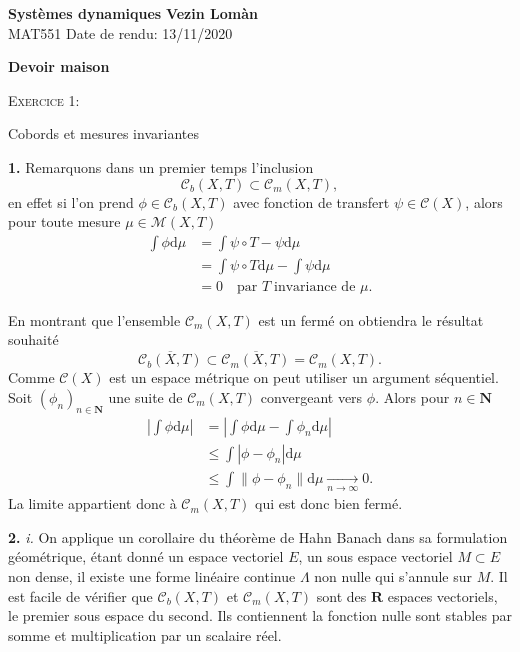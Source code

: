 \documentclass[12pt]{article}
\newenvironment{ex}[1]
{\begin{mdframed}[linewidth=0.6pt]
        \textsc{Exercice #1:}

}
    {\end{mdframed}}
\newcommand{\R}{\mathbf{R}}
\newcommand{\N}{\mathbf{N}}
\newcommand{\de}{\mathrm{d}}
\begin{document}
        \noindent
\textbf{Systèmes dynamiques} \hfill \textbf{Vezin Lomàn}\\
\normalsize MAT551  \hfill Date de rendu: 13/11/2020\\

\begin{center}
\textbf{Devoir maison}
\end{center}

\begin{ex}{1}
        Cobords et mesures invariantes
\end{ex}

\textbf{1.} Remarquons dans un premier temps l'inclusion
\[
        \mathcal{C}_{b}(X,T) \subset \mathcal{C}_{m}(X,T)
,\] en effet si l'on prend $\phi \in \mathcal{C}_{b}(X,T)$ avec fonction de transfert $\psi \in \mathcal{C}(X)$, alors pour toute mesure $\mu \in \mathcal{M}(X,T)$ 
\begin{align*}
        \int\phi\de\mu &= \int\psi\circ T - \psi\de\mu \\
                       &= \int \psi \circ T \de \mu - \int\psi\de\mu \\
                       &= 0 \quad \text{par } T \; \text{invariance de } \mu
.\end{align*}

En montrant que l'ensemble $\mathcal{C}_{m}(X,T)$ est un fermé on obtiendra le résultat souhaité \[
        \overline{\mathcal{C}_{b}(X,T)} \subset \overline{\mathcal{C}_{m}(X,T)} = \mathcal{C}_{m}(X,T)
.\] 
Comme $\mathcal{C}(X)$ est un espace métrique on peut utiliser un argument séquentiel. Soit $(\phi_{n})_{n\in\N}$ une suite de $\mathcal{C}_{m}(X,T)$ convergeant vers $\phi$. Alors pour $n \in \N$
\begin{align*}
        |\int\phi\de\mu| &= |\int\phi\de\mu - \int\phi_{n}\de\mu| \\
                         &\le \int|\phi-\phi_{n}|\de\mu \\
                         &\le\int\|\phi-\phi_{n}\|\de\mu \underset{n\to \infty}{\longrightarrow} 0
.\end{align*}
La limite appartient donc à $\mathcal{C}_{m}(X,T)$ qui est donc bien fermé.

\textbf{2.} \textit{i.} On applique un corollaire du théorème de Hahn Banach dans sa formulation géométrique, étant donné un espace vectoriel $E$, un sous espace vectoriel $M \subset E$ non dense, il existe une forme linéaire continue $\Lambda$ non nulle qui s'annule sur $M$. Il est facile de vérifier que $\mathcal{C}_{b}(X,T)$ et $\mathcal{C}_{m}(X,T)$ sont des $\R$ espaces vectoriels, le premier sous espace du second. Ils contiennent la fonction nulle sont stables par somme et multiplication par un scalaire réel. 
\end{document}
